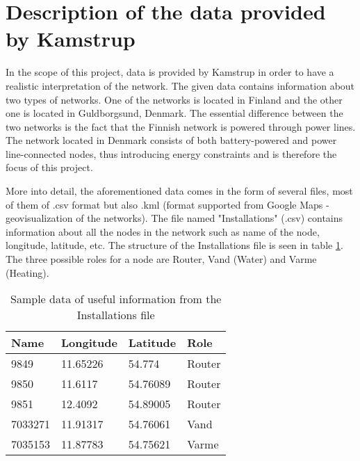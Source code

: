 \section{Description of the data provided by Kamstrup}
\label{sec:data_description}

In the scope of this project, data is provided by Kamstrup in order to have a realistic interpretation of the network. The given data contains information about two types of networks. One of the networks is located in Finland and the other one is located in Guldborgsund, Denmark. The essential difference between the two networks is the fact that the Finnish network is powered through power lines. The network located in Denmark consists of both battery-powered and power line-connected nodes, thus introducing energy constraints and is therefore the focus of this project.

More into detail, the aforementioned data comes in the form of several files, most of them of .csv format but also .kml (format supported from Google Maps - geovisualization of the networks). The file named "Installations" (.csv) contains information about all the nodes in the network such as name of the node, longitude, latitude, etc. The structure of the Installations file is seen in table \ref{tab:installations}. The three possible roles for a node are Router, Vand (Water) and Varme (Heating).
\begin{table}[H]
\begin{center}
    \begin{tabular}{ | l | l | l | l |}
    \hline
    Name & Longitude & Latitude & Role \\ \hline
    9849 & 11.65226 & 54.774 & Router \\ \hline
    9850 & 11.6117 & 54.76089 & Router \\ \hline
    9851 & 12.4092 & 54.89005 & Router \\ \hline
    7033271 & 11.91317 & 54.76061 & Vand \\ \hline
    7035153 & 11.87783 & 54.75621 & Varme \\
    \hline
    \end{tabular}
\end{center}
\caption{Sample data of useful information from the Installations file}
\label{tab:installations}
\end{table}

